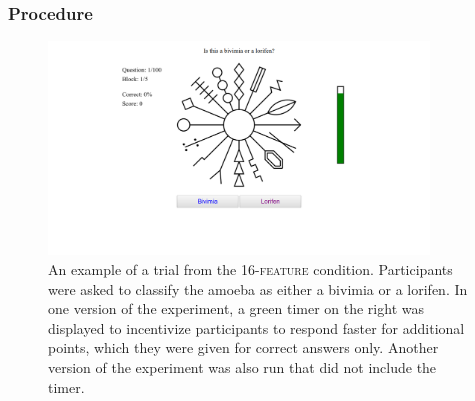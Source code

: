 \documentclass[a4paper, doc, floatsintext]{apa6}
\begin{document}
\subsubsection{Procedure}

\begin{figure}[t]
  \begin{center}
    \includegraphics[width=0.9\textwidth]{figures/experiment-trial.png}
    \vspace{-10mm}
    \caption{{\small An example of a trial from the 16-\textsc{feature} condition. Participants were asked to classify the amoeba as either a \textsf{bivimia} or a \textsf{lorifen}. In one version of the experiment, a green timer on the right was displayed to incentivize participants to respond faster for additional points, which they were given for correct answers only. Another version of the experiment was also run that did not include the timer.}}
    \label{experiment-trial}
          \vspace{-5mm}
  \end{center}
\end{figure}
\end{document}
